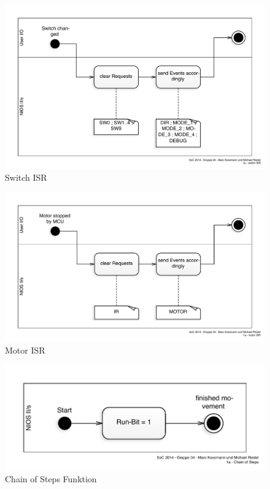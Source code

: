 \documentclass[ngerman,fontsize=12pt , paper=a4 , twoside=false , DIV12 , BCOR=1cm ,
numbers=enddot , listof=totoc , bibliography=totoc , index=totoc ,
headings=small , headlines=1.5 , final]{scrbook}
\begin{document}
\begin{figure}[htbp]
\centering
\includegraphics{../Diagrams/Activities/ISR/switch_ISR.pdf}
\caption{Switch ISR\label{fig:switch_isr}}
\end{figure}

\begin{figure}[htbp]
\centering
\includegraphics{../Diagrams/Activities/ISR/motor_ISR.pdf}
\caption{Motor ISR\label{fig:motor_isr}}
\end{figure}

\newpage

\begin{figure}[htbp]
\centering
\includegraphics{../Diagrams/Activities/Functions/Chain-of-Steps.pdf}
\caption{Chain of Steps Funktion\label{fig:chain_of_steps}}
\end{figure}
\end{document}
